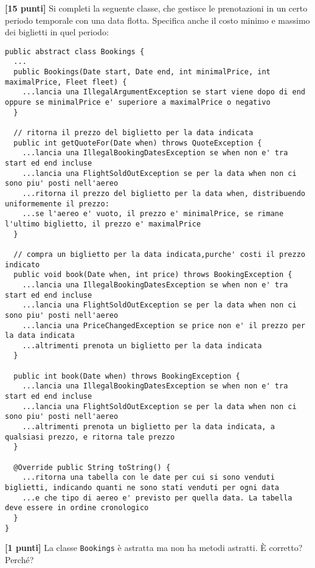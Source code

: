 \documentclass{article}[10pt]
\newcounter{esnu}
\newenvironment{esercizio}{\medskip \noindent {\bf Esercizio\addtocounter{esnu}{1} \arabic{esnu}}}{}
\begin{document}
\begin{esercizio}
\textbf{[15 punti]}
Si completi la seguente classe, che gestisce le prenotazioni in un certo periodo temporale con una data flotta.
Specifica anche il costo minimo e massimo dei biglietti in quel periodo:

{\scriptsize\begin{verbatim}
public abstract class Bookings {
  ...
  public Bookings(Date start, Date end, int minimalPrice, int maximalPrice, Fleet fleet) {
    ...lancia una IllegalArgumentException se start viene dopo di end oppure se minimalPrice e' superiore a maximalPrice o negativo
  }

  // ritorna il prezzo del biglietto per la data indicata
  public int getQuoteFor(Date when) throws QuoteException {
    ...lancia una IllegalBookingDatesException se when non e' tra start ed end incluse
    ...lancia una FlightSoldOutException se per la data when non ci sono piu' posti nell'aereo
    ...ritorna il prezzo del biglietto per la data when, distribuendo uniformemente il prezzo:
    ...se l'aereo e' vuoto, il prezzo e' minimalPrice, se rimane l'ultimo biglietto, il prezzo e' maximalPrice
  }

  // compra un biglietto per la data indicata,purche' costi il prezzo indicato
  public void book(Date when, int price) throws BookingException {
    ...lancia una IllegalBookingDatesException se when non e' tra start ed end incluse
    ...lancia una FlightSoldOutException se per la data when non ci sono piu' posti nell'aereo
    ...lancia una PriceChangedException se price non e' il prezzo per la data indicata
    ...altrimenti prenota un biglietto per la data indicata
  }

  public int book(Date when) throws BookingException {
    ...lancia una IllegalBookingDatesException se when non e' tra start ed end incluse
    ...lancia una FlightSoldOutException se per la data when non ci sono piu' posti nell'aereo
    ...altrimenti prenota un biglietto per la data indicata, a qualsiasi prezzo, e ritorna tale prezzo
  }

  @Override public String toString() {
    ...ritorna una tabella con le date per cui si sono venduti biglietti, indicando quanti ne sono stati venduti per ogni data
    ...e che tipo di aereo e' previsto per quella data. La tabella deve essere in ordine cronologico
  }
}
\end{verbatim}}
%
\end{esercizio}

\begin{esercizio}
\textbf{[1 punti]}
La classe \texttt{Bookings} \`e astratta ma non ha metodi astratti. \`E corretto? Perch\'e?
\end{esercizio}
\end{document}

